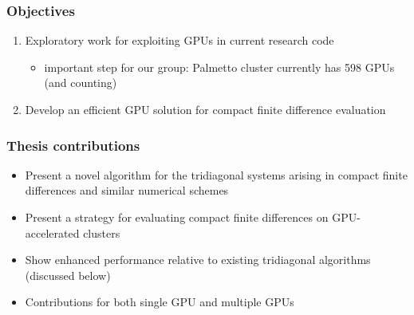 \begin{frame}
\frametitle{Objectives}
\begin{enumerate}
\item Exploratory work for exploiting GPUs
    in current research code
    \begin{itemize}
    \item important step for our group: Palmetto cluster
    currently has 598 GPUs (and counting)
    \end{itemize}
\item Develop an efficient GPU solution
    for compact finite difference evaluation
\end{enumerate}
\end{frame}

\begin{frame}
\frametitle{Thesis contributions}
\begin{itemize}
\item Present a novel algorithm for
    the tridiagonal systems arising in
    compact finite differences
    and similar numerical schemes
\item Present a strategy for evaluating compact
    finite differences on GPU-accelerated clusters
\item Show enhanced performance relative to existing
    tridiagonal algorithms (discussed below)
\item Contributions for both single GPU
    and multiple GPUs
\end{itemize}
\end{frame}
